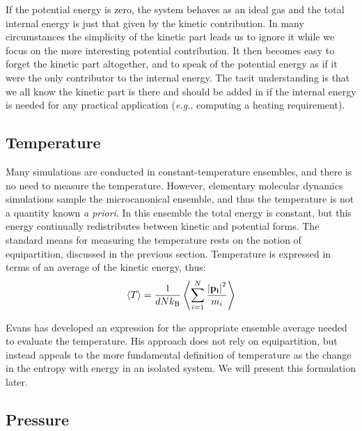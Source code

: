 \documentclass[9pt,bestpractices]{molsim}
\begin{document}
If the potential energy is zero, the system behaves as an ideal gas and
the total internal energy is just that given by the kinetic
contribution. In many circumstances the simplicity of the kinetic part
leads us to ignore it while we focus on the more interesting potential
contribution. It then becomes easy to forget the kinetic part
altogether, and to speak of the potential energy as if it were the only
contributor to the internal energy. The tacit understanding is that we
all know the kinetic part is there and should be added in if the
internal energy is needed for any practical application (\emph{e.g.},
computing a heating requirement).

\subsection{Temperature}\label{temperature}

Many simulations are conducted in constant-temperature ensembles, and
there is no need to measure the temperature. However, elementary
molecular dynamics simulations sample the microcanonical ensemble, and
thus the temperature is not a quantity known \emph{a priori}. In this
ensemble the total energy is constant, but this energy continually
redistributes between kinetic and potential forms. The standard means
for measuring the temperature rests on the notion of equipartition,
discussed in the previous section. Temperature is expressed in terms of
an average of the kinetic energy, thus:
\[\left\langle T \right\rangle  = \frac{1}{dNk_{\rm B}}\left\langle {\sum\limits_{i = 1}^N \frac{\left| \bf{p}_i \right|^2} {m_i}} \right\rangle \]

Evans has developed an expression for the appropriate ensemble
average needed to evaluate the temperature. His approach does not rely
on equipartition, but instead appeals to the more fundamental definition
of temperature as the change in the entropy with energy in an isolated
system. We will present this formulation later.

\subsection{Pressure}\label{pressure}
\end{document}
